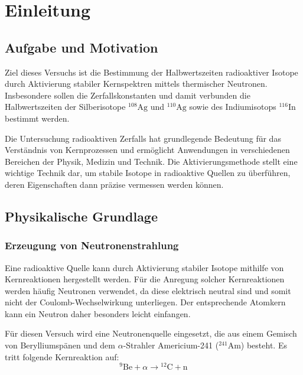 \chapter{Einleitung} \label{ch:Einleitung}

\section{Aufgabe und Motivation}
\label{sec:AuM}

Ziel dieses Versuchs ist die Bestimmung der Halbwertszeiten radioaktiver Isotope durch Aktivierung stabiler Kernspektren mittels thermischer Neutronen. Insbesondere sollen die Zerfallskonstanten und damit verbunden die Halbwertszeiten der Silberisotope $^{108}\mathrm{Ag}$ und $^{110}\mathrm{Ag}$ sowie des Indiumisotops $^{116}\mathrm{In}$ bestimmt werden. 

Die Untersuchung radioaktiven Zerfalls hat grundlegende Bedeutung für das Verständnis von Kernprozessen und ermöglicht Anwendungen in verschiedenen Bereichen der Physik, Medizin und Technik. Die Aktivierungsmethode stellt eine wichtige Technik dar, um stabile Isotope in radioaktive Quellen zu überführen, deren Eigenschaften dann präzise vermessen werden können. 

\section{Physikalische Grundlage}
\label{sec:PhyBasics}

\subsection{Erzeugung von Neutronenstrahlung}

Eine radioaktive Quelle kann durch Aktivierung stabiler Isotope mithilfe von Kernreaktionen hergestellt werden. Für die Anregung solcher Kernreaktionen werden häufig Neutronen verwendet, da diese elektrisch neutral sind und somit nicht der Coulomb-Wechselwirkung unterliegen. Der entsprechende Atomkern kann ein Neutron daher besonders leicht einfangen.

Für diesen Versuch wird eine Neutronenquelle eingesetzt, die aus einem Gemisch von Berylliumspänen und dem $\alpha$-Strahler Americium-241 ($^{241}\mathrm{Am}$) besteht. Es tritt folgende Kernreaktion auf:
\begin{equation}
    \label{eq:neutronenerzeugung}
    ^{9}\mathrm{Be} + \alpha \rightarrow {}^{12}\mathrm{C} + \mathrm{n}
\end{equation}

